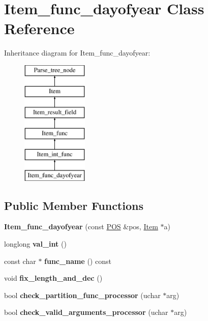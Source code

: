 \hypertarget{classItem__func__dayofyear}{}\section{Item\+\_\+func\+\_\+dayofyear Class Reference}
\label{classItem__func__dayofyear}
Inheritance diagram for Item\+\_\+func\+\_\+dayofyear\+:\begin{figure}[H]
\begin{center}
\leavevmode
\includegraphics[height=6.000000cm]{classItem__func__dayofyear}
\end{center}
\end{figure}
\subsection*{Public Member Functions}
\begin{DoxyCompactItemize}
\item 
\mbox{\label{classItem__func__dayofyear_a915f9ad4027e48a9da030c05fc7df01c}} 
{\bfseries Item\+\_\+func\+\_\+dayofyear} (const \mbox{\hyperlink{structYYLTYPE}{P\+OS}} \&pos, \mbox{\hyperlink{classItem}{Item}} $\ast$a)
\item 
\mbox{\label{classItem__func__dayofyear_a7843d6562838aed3a762acedd26e714f}} 
longlong {\bfseries val\+\_\+int} ()
\item 
\mbox{\label{classItem__func__dayofyear_a8aeca83923e6d001b1bc98775b343e00}} 
const char $\ast$ {\bfseries func\+\_\+name} () const
\item 
\mbox{\label{classItem__func__dayofyear_a20548b4c28d395c41688e11dbc56c231}} 
void {\bfseries fix\+\_\+length\+\_\+and\+\_\+dec} ()
\item 
\mbox{\label{classItem__func__dayofyear_a468c347f163a2b9ea728f6db679ae163}} 
bool {\bfseries check\+\_\+partition\+\_\+func\+\_\+processor} (uchar $\ast$arg)
\item 
\mbox{\label{classItem__func__dayofyear_addad10ad4702aed5dac2c6888cf2dbc8}} 
bool {\bfseries check\+\_\+valid\+\_\+arguments\+\_\+processor} (uchar $\ast$arg)
\end{DoxyCompactItemize}
